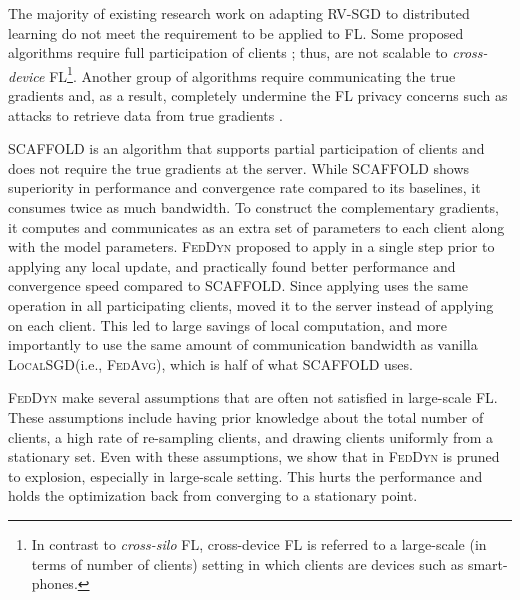 \documentclass[runningheads]{llncs}
\newcommand{\fedavg}{\textsc{FedAvg}\xspace}
\newcommand{\scaffold}{\textsc{SCAFFOLD}\xspace}
\newcommand{\feddyn}{\textsc{FedDyn}\xspace}
\newcommand{\localsgd}{\textsc{LocalSGD}\xspace}
\newcommand{\rvsgd}{\textsc{RV-SGD}\xspace}
\begin{document}
The majority of existing research work on adapting \rvsgd to distributed learning do not meet the requirement to be applied to FL.
Some proposed algorithms require full participation of clients \cite{shamir2014communication,reddi2016aide,liang2019variance}; thus, are not scalable to \emph{cross-device} FL\footnote{In contrast to \emph{cross-silo} FL, cross-device FL is referred to a large-scale (in terms of number of clients) setting in which clients are devices such as smart-phones.}.
Another group of algorithms require communicating the true gradients \cite{li2019feddane,murata2021bias} and, as a result, completely undermine the FL privacy concerns such as attacks to retrieve data from true gradients \cite{zhu2020deep}.


\scaffold \cite{karimireddy2020scaffold} is an algorithm that supports partial participation of clients and does not require the true gradients at the server.
While \scaffold shows superiority in performance and convergence rate compared to its baselines, it consumes twice as much bandwidth. 
To construct the complementary gradients, it computes and communicates  as an extra set of parameters to each client along with the model parameters.
\feddyn \cite{acar2021federated} proposed to apply  in a single step prior to applying any local update, and practically found better performance and convergence speed compared to \scaffold.
Since applying  uses the same operation in all participating clients, \cite{acar2021federated} moved it to the server instead of applying on each client.
This led to large savings of local computation, and more importantly to use the same amount of communication bandwidth as vanilla \localsgd (i.e., \fedavg), which is half of what \scaffold uses.


\feddyn make several assumptions that are often not satisfied in large-scale FL.
These assumptions include having prior knowledge about the total number of clients, a high rate of re-sampling clients, and drawing clients uniformly from a stationary set.
Even with these assumptions, we show that  in \feddyn is pruned to explosion, especially in large-scale setting. 
This hurts the performance and holds the optimization back from converging to a stationary point.
\end{document}
